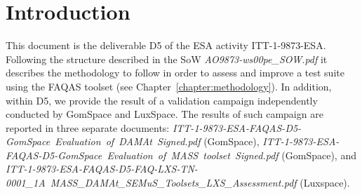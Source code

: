 
\chapter*{Introduction}
\label{sec:introduction}

This document is the deliverable D5 of the ESA activity ITT-1-9873-ESA. Following the structure described in the SoW \emph{AO9873-ws00pe\_SOW.pdf} it describes the methodology to follow in order to assess and improve a test suite using the FAQAS toolset (see Chapter~\ref{chapter:methodology}). In addition, within D5, we provide the result of a validation campaign independently conducted by GomSpace and LuxSpace. The results of such campaign are reported in three separate documents: \emph{ITT-1-9873-ESA-FAQAS-D5-GomSpace\ Evaluation\ of\ DAMAt\ Signed.pdf} (GomSpace), \emph{ITT-1-9873-ESA-FAQAS-D5-GomSpace\ Evaluation\ of\ MASS\ toolset\ Signed.pdf} (GomSpace), and \emph{ITT-1-9873-ESA-FAQAS-D5-FAQ-LXS-TN-0001\_1A\ MASS\_DAMAt\_SEMuS\_Toolsets\_LXS\_Assessment.pdf} (Luxspace).
 
